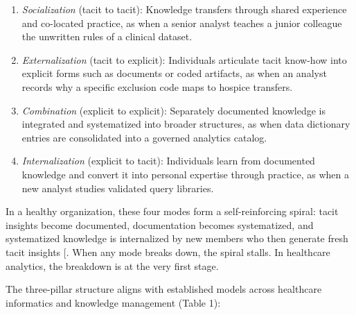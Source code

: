 \documentclass[
  american,
  11pt,
  letterpaper,
  oneside  ,captions=tableheading
]{scrartcl}
\providecommand{\tightlist}{%
  \setlength{\itemsep}{0pt}\setlength{\parskip}{0pt}}
\begin{document}
\begin{enumerate}
\def\labelenumi{\arabic{enumi}.}
\tightlist
\item
  \emph{Socialization} (tacit to tacit): Knowledge transfers through
  shared experience and co-located practice, as when a senior analyst
  teaches a junior colleague the unwritten rules of a clinical dataset.
\item
  \emph{Externalization} (tacit to explicit): Individuals articulate
  tacit know-how into explicit forms such as documents or coded
  artifacts, as when an analyst records why a specific exclusion code
  maps to hospice transfers.
\item
  \emph{Combination} (explicit to explicit): Separately documented
  knowledge is integrated and systematized into broader structures, as
  when data dictionary entries are consolidated into a governed
  analytics catalog.
\item
  \emph{Internalization} (explicit to tacit): Individuals learn from
  documented knowledge and convert it into personal expertise through
  practice, as when a new analyst studies validated query libraries.
\end{enumerate}

In a healthy organization, these four modes form a self-reinforcing
spiral: tacit insights become documented, documentation becomes
systematized, and systematized knowledge is internalized by new members
who then generate fresh tacit insights
{[}\citeproc{ref-farnese2019}{16}{]}. When any mode breaks down, the
spiral stalls. In healthcare analytics, the breakdown is at the very
first stage.

The three-pillar structure aligns with established models across
healthcare informatics and knowledge management (Table 1):
\end{document}
